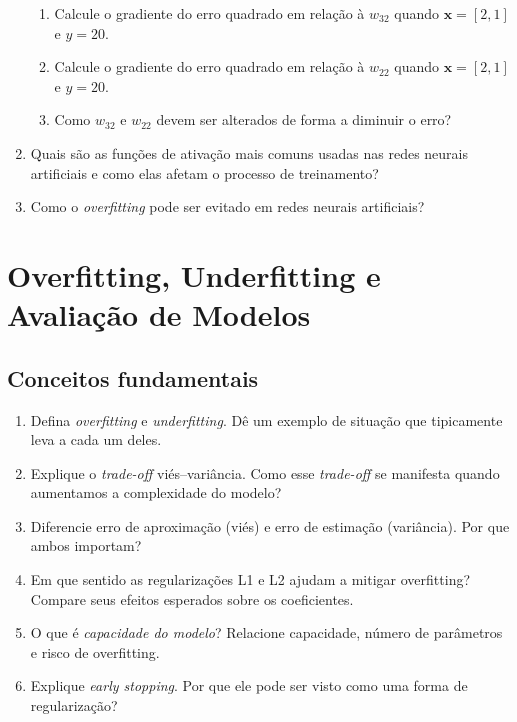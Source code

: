\documentclass{article}
\begin{document}
\begin{enumerate}
    \begin{enumerate}
        \item Calcule o gradiente do erro quadrado em relação à $w_{32}$ quando $\mathbf{x} = [2,1]$ e $y = 20$.
        \item Calcule o gradiente do erro quadrado em relação à $w_{22}$ quando $\mathbf{x} = [2,1]$ e $y = 20$. 
        \item Como $w_{32}$ e $w_{22}$ devem ser alterados de forma a diminuir o erro?   
    \end{enumerate}
    
    \item Quais são as funções de ativação mais comuns usadas nas redes neurais artificiais e como elas afetam o processo de treinamento?

    \item Como o \textit{overfitting} pode ser evitado em redes neurais artificiais?
    
  \end{enumerate}

  \section{Overfitting, Underfitting e Avaliação de Modelos}

\subsection{Conceitos fundamentais}
\begin{enumerate}
  \item Defina \textit{overfitting} e \textit{underfitting}. Dê um exemplo de situação que tipicamente leva a cada um deles.
  \item Explique o \textit{trade-off} viés–variância. Como esse \textit{trade-off} se manifesta quando aumentamos a complexidade do modelo?
  \item Diferencie erro de aproximação (viés) e erro de estimação (variância). Por que ambos importam?
  \item Em que sentido as regularizações L1 e L2 ajudam a mitigar overfitting? Compare seus efeitos esperados sobre os coeficientes.
  \item O que é \textit{capacidade do modelo}? Relacione capacidade, número de parâmetros e risco de overfitting.
  \item Explique \textit{early stopping}. Por que ele pode ser visto como uma forma de regularização?
\end{enumerate}
\end{document}
